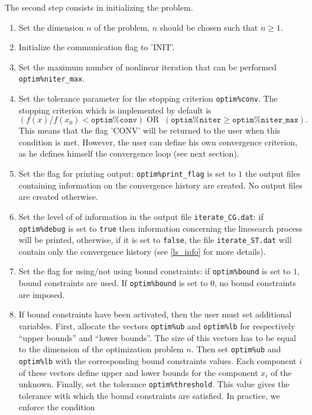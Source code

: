 \documentclass[a4paper,twoside,final,onecolumn,11pt,openright]{article}
\begin{document}
The second step consists in initializing the problem.
\begin{enumerate}
 \item Set the dimension $n$ of the problem, $n$ should be chosen such that $n\geq1$.
 \item Initialize the communication flag to 'INIT'.
 \item Set the maximum number of nonlinear iteration that can be performed \texttt{optim\%niter\_max}.
 \item Set the tolerance parameter for the stopping criterion \texttt{optim\%conv}. The stopping criterion which is implemented by default is 
\begin{equation}
 \left(f(x)/f(x_0)< \texttt{optim\%conv}\right) \; \textrm{OR} \;\;  \left(\texttt{optim\%niter}\geq\texttt{optim\%niter\_max}\right).
\end{equation}
This means that the flag 'CONV' will be returned to the user when this condition is met. However, the user can define his own convergence criterion, as he defines himself the convergence loop (see next section).
\item  Set the flag for printing output: \texttt{optim\%print\_flag} is set to $1$ the output files containing information on the convergence history are created. No output files are created otherwise. 
 \item Set the level of of information in the output file \texttt{iterate\_CG.dat}: if \texttt{optim\%debug} is set to \texttt{true} then information concerning the linesearch process will be printed, otherwise, if it is set to \texttt{false}, the file \texttt{iterate\_ST.dat} will contain only the convergence history (see \ref{ls_info} for more details).
\item Set the flag for using/not using bound constraints: if \texttt{optim\%bound} is set to $1$, bound constraints are used. If  \texttt{optim\%bound} is set to $0$, no bound constraints are imposed.
\item If bound constraints have been activated, then the user must set additional variables. First, allocate the vectors \texttt{optim\%ub} and \texttt{optim\%lb} for respectively ``upper bounds'' and ``lower bounds''. The size of this vectors has to be equal to the dimension of the optimization problem $n$. Then set \texttt{optim\%ub} and \texttt{optim\%lb} with the corresponding bound constraints values. Each component $i$ of these vectors define upper and lower bounds for the component $x_i$ of the unknown. Finally, set the tolerance \texttt{optim\%threshold}. This value gives the tolerance with which the bound constraints are satisfied. In practice, we enforce the condition

\end{enumerate}
\end{document}
